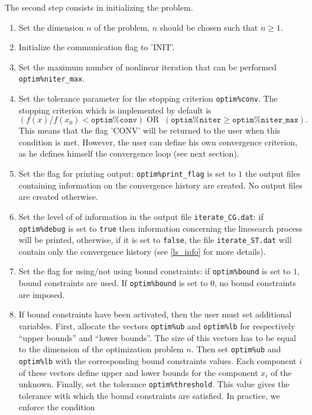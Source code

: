 \documentclass[a4paper,twoside,final,onecolumn,11pt,openright]{article}
\begin{document}
The second step consists in initializing the problem.
\begin{enumerate}
 \item Set the dimension $n$ of the problem, $n$ should be chosen such that $n\geq1$.
 \item Initialize the communication flag to 'INIT'.
 \item Set the maximum number of nonlinear iteration that can be performed \texttt{optim\%niter\_max}.
 \item Set the tolerance parameter for the stopping criterion \texttt{optim\%conv}. The stopping criterion which is implemented by default is 
\begin{equation}
 \left(f(x)/f(x_0)< \texttt{optim\%conv}\right) \; \textrm{OR} \;\;  \left(\texttt{optim\%niter}\geq\texttt{optim\%niter\_max}\right).
\end{equation}
This means that the flag 'CONV' will be returned to the user when this condition is met. However, the user can define his own convergence criterion, as he defines himself the convergence loop (see next section).
\item  Set the flag for printing output: \texttt{optim\%print\_flag} is set to $1$ the output files containing information on the convergence history are created. No output files are created otherwise. 
 \item Set the level of of information in the output file \texttt{iterate\_CG.dat}: if \texttt{optim\%debug} is set to \texttt{true} then information concerning the linesearch process will be printed, otherwise, if it is set to \texttt{false}, the file \texttt{iterate\_ST.dat} will contain only the convergence history (see \ref{ls_info} for more details).
\item Set the flag for using/not using bound constraints: if \texttt{optim\%bound} is set to $1$, bound constraints are used. If  \texttt{optim\%bound} is set to $0$, no bound constraints are imposed.
\item If bound constraints have been activated, then the user must set additional variables. First, allocate the vectors \texttt{optim\%ub} and \texttt{optim\%lb} for respectively ``upper bounds'' and ``lower bounds''. The size of this vectors has to be equal to the dimension of the optimization problem $n$. Then set \texttt{optim\%ub} and \texttt{optim\%lb} with the corresponding bound constraints values. Each component $i$ of these vectors define upper and lower bounds for the component $x_i$ of the unknown. Finally, set the tolerance \texttt{optim\%threshold}. This value gives the tolerance with which the bound constraints are satisfied. In practice, we enforce the condition

\end{enumerate}
\end{document}
